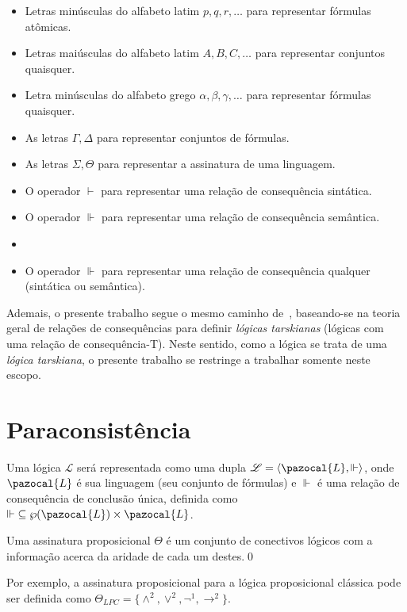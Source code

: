 \begin{itemize}
    \item Letras minúsculas do alfabeto latim $p, q, r, \ldots$ para representar fórmulas atômicas.
    \item Letras maiúsculas do alfabeto latim $A, B, C, \ldots$ para representar conjuntos quaisquer.
    \item Letra minúsculas do alfabeto grego $\alpha, \beta, \gamma, \ldots$ para representar fórmulas quaisquer.
    \item As letras $\Gamma, \Delta$ para representar conjuntos de fórmulas.
    \item As letras $\Sigma, \Theta$ para representar a assinatura de uma linguagem.
    \item O operador $\vdash$ para representar uma relação de consequência sintática.
    \item O operador $\Vdash$ para representar uma relação de consequência semântica.
    \item \item O operador $\Vdash$ para representar uma relação de consequência qualquer (sintática ou semântica).
\end{itemize}

Ademais, o presente trabalho segue o mesmo caminho de~, baseando-se na teoria geral de relações de consequências para definir \textit{lógicas tarskianas} (lógicas com uma relação de consequência-T). Neste sentido, como a lógica \lfium{} se trata de uma \textit{lógica tarskiana}, o presente trabalho se restringe a trabalhar somente neste escopo.

\section{Paraconsistência}
\label{sec:paracons}

Uma lógica $\mathcal{L}$ será representada como uma dupla $\mathcal{L} = \langle \pazocal{L},\Vdash \rangle$, onde $\pazocal{L}$ é sua linguagem (seu conjunto de fórmulas) e $\Vdash$ é uma relação de consequência de conclusão única, definida como $\Vdash \;\subseteq \wp(\pazocal{L})\times\pazocal{L}$.

\begin{definicao}
    \label{def:ass_prop}
    Uma assinatura proposicional $\Theta$ é um conjunto de conectivos lógicos com a informação acerca da aridade de cada um destes.\qed{}
\end{definicao}
Por exemplo, a assinatura proposicional para a lógica proposicional clássica pode ser definida como $\Theta_{LPC} = \{\land^{2}, \lor^{2}, \neg^{1}, \rightarrow^{2}\}$.

